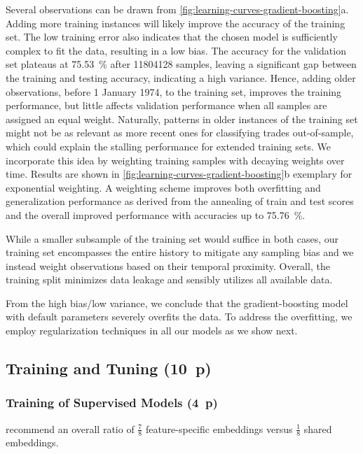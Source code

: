 Several observations can be drawn from \cref{fig:learning-curves-gradient-boosting}a. Adding more training instances will likely improve the accuracy of the training set. The low training error also indicates that the chosen model is sufficiently complex to fit the data, resulting in a low bias. The accuracy for the validation set plateaus at \SI{75.53}{\percent} after \num{11804128} samples, leaving a significant gap between the training and testing accuracy, indicating a high variance. Hence, adding older observations, before 1 January 1974, to the training set, improves the training performance, but little affects validation performance when all samples are assigned an equal weight. Naturally, patterns in older instances of the training set might not be as relevant as more recent ones for classifying trades out-of-sample, which could explain the stalling performance for extended training sets. We incorporate this idea by weighting training samples with decaying weights over time. Results are shown in \cref{fig:learning-curves-gradient-boosting}b exemplary for exponential weighting. A weighting scheme improves both overfitting and generalization performance as derived from the annealing of train and test scores and the overall improved performance with accuracies up to \SI{75.76}{\percent}.

While a smaller subsample of the training set would suffice in both cases, our training set encompasses the entire history to mitigate any sampling bias and we instead weight observations based on their temporal proximity. Overall, the training split minimizes data leakage and sensibly utilizes all available data.

From the high bias/low variance, we conclude that the gradient-boosting model with default parameters severely overfits the data. To address the overfitting, we employ regularization techniques in all our models as we show next.

\subsection{Training and Tuning (10~p)}\label{sec:training-and-tuning}

\subsubsection{Training of Supervised
    Models (4~p)}\label{sec:training-of-supervised-models}

\textcite[][12]{huangTabTransformerTabularData2020} recommend an overall ratio of $\tfrac{7}{8}$ feature-specific embeddings versus $\tfrac{1}{8}$ shared embeddings.

